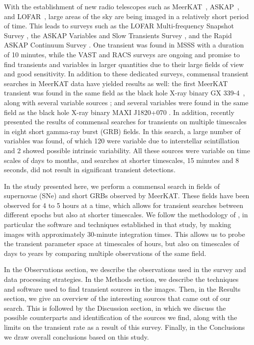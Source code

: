 \documentclass[12pt]{article}
\begin{document}
With the establishment of new radio telescopes such as MeerKAT~\citep{2009IEEEP..97.1522J}, ASKAP~\citep{2008ExA....22..151J}, and LOFAR~\citep{2013A&A...556A...2V}, large areas of the sky are being imaged in a relatively short period of time. This leads to surveys such as the LOFAR Multi-frequency Snapshot Survey \citep[MSSS;][]{2016MNRAS.456.2321S}, the ASKAP Variables and Slow Transients Survey \citep[VAST;][]{2021PASA...38...54M}, and the Rapid ASKAP Continuum Survey \citep[RACS;][]{2020PASA...37...48M}. One transient was found in MSSS with a duration of 10 minutes, while the VAST and RACS surveys are ongoing and promise to find transients and variables in larger quantities due to their large fields of view and good sensitivity. In addition to these dedicated surveys, commensal transient searches in MeerKAT data have yielded results as well: the first MeerKAT transient was found in the same field as the black hole X-ray binary GX 339-4~\citep{2020MNRAS.491..560D}, along with several variable sources \citep{2022MNRAS.512.5037D}; and several variables were found in the same field as the black hole X-ray binary MAXI J1820+070 \citep{2022MNRAS.517.2894R}. In addition, \citep{commensal1} recently presented the results of commensal searches for transients on multiple timescales in eight short gamma-ray burst (GRB) fields. In this search, a large number of variables was found, of which 120 were variable due to interstellar scintillation and 2 showed possible intrinsic variability. All these sources were variable on time scales of days to months, and searches at shorter timescales, 15 minutes and 8 seconds, did not result in significant transient detections.

In the study presented here, we perform a commensal search in fields of supernovae (SNe) and short GRBs observed by MeerKAT. These fields have been observed for 4 to 5 hours at a time, which allows for transient searches between different epochs but also at shorter timescales. We follow the methodology of \citet{commensal1}, in particular the software and techniques established in that study, by making images with approximately 30-minute integration times. This allows us to probe the transient parameter space at timescales of hours, but also on timescales of days to years by comparing multiple observations of the same field.

In the Observations section, we describe the observations used in the survey and data processing strategies. In the Methods section, we describe the techniques and software used to find transient sources in the images. Then, in the Results section, we give an overview of the interesting sources that came out of our search. This is followed by the Discussion section, in which we discuss the possible counterparts and identification of the sources we find, along with the limits on the transient rate as a result of this survey. Finally, in the Conclusions we draw overall conclusions based on this study.
\end{document}
